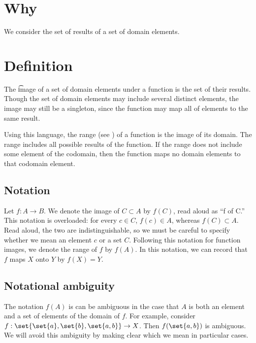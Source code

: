 

\section*{Why}

We consider the set of results of a set of domain elements.

\section*{Definition}

The \t{image} of a set of domain elements under a function is the set of their results.
Though the set of domain elements may include several distinct elements, the image may still be a singleton, since the function may map all of elements to the same result.

Using this language, the range (see ) of a function is the image of its domain.
The range includes all possible results of the function.
If the range does not include some element of the codomain, then the function maps no domain elements to that codomain element.

\subsection*{Notation}

Let $f: A \to B$.
We denote the image of $C \subset A$ by $f(C)$, read aloud as ``f of C.''
This notation is overloaded: for every $c \in C$, $f(c) \in A$, whereas $f(C) \subset A$.
Read aloud, the two are indistinguishable, so we must be careful to specify whether we mean an element $c$ or a set $C$.
Following this notation for function images, we denote the range of $f$ by $f(A)$.
In this notation, we can record that $f$ maps $X$ onto $Y$ by $f(X) = Y$.

\subsection*{Notational ambiguity}

The notation $f(A)$ is can be ambiguous in the case that $A$ is both an element and a set of elements of the domain of $f$.
For example, consider $f: \set{\set{a}, \set{b}, \set{a, b}} \to X$.
Then $f(\set{a, b})$ is ambiguous.
We will avoid this ambiguity by making clear which we mean in particular cases.

